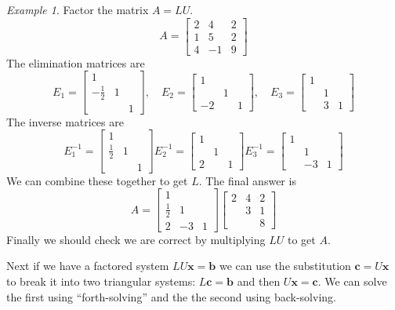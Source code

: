 \documentclass[11pt,oneside]{amsbook}
\theoremstyle{definition}
\theoremstyle{plain}
\theoremstyle{definition}
\theoremstyle{remark}
\newtheorem{example}[theorem]{Example}
\numberwithin{equation}{section}
\numberwithin{figure}{section}
\begin{document}
\begin{example}
  Factor the matrix $A=LU$.
  \[A=\begin{bmatrix}2&4&2\\1&5&2\\4&-1&9\end{bmatrix}
  \]
  The elimination matrices are
  \[E_1=\begin{bmatrix}1\\-\frac12&1\\&&1\end{bmatrix},\quad
    E_2=\begin{bmatrix}1\\&1\\-2&&1\end{bmatrix},\quad
    E_3=\begin{bmatrix}1\\&1\\&3&1\end{bmatrix}
  \]
  The inverse matrices are
  \[E_1^{-1}=\begin{bmatrix}1\\\frac12&1\\&&1\end{bmatrix}
    E_2^{-1}=\begin{bmatrix}1\\&1\\2&&1\end{bmatrix}
    E_3^{-1}=\begin{bmatrix}1\\&1\\&-3&1\end{bmatrix}
  \]
  We can combine these together to get $L$. The final answer is
  \[A=\begin{bmatrix}1&&\\\frac12&1&\\2&-3&1\end{bmatrix}
    \begin{bmatrix}2&4&2\\&3&1\\&&8\end{bmatrix}
  \]
  Finally we should check we are correct by multiplying $LU$ to get $A$.
\end{example}

Next if we have a factored system $LU\bm{x}=\bm{b}$ we can use the substitution $\bm{c}=U\bm{x}$ to break it into two triangular systems: $L\bm{c}=\bm{b}$ and then $U\bm{x}=\bm{c}$. We can solve the first using ``forth-solving'' and the the second using back-solving.
\end{document}
